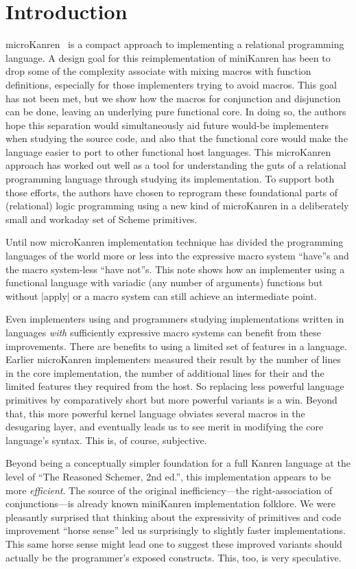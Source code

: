 \documentclass[sigplan,screen,draft,anonymous,review,natbib=false]{acmart}
\begin{document}
\section{Introduction}

microKanren~\cite{hemann2013muKanren} is a compact approach to
implementing a relational programming language. A design goal
for this reimplementation of miniKanren has been to drop some of the
complexity associate with mixing macros with function definitions,
especially for those implementers trying to avoid macros.  This goal
has not been met, but we show how the macros for conjunction and
disjunction can be done, leaving an underlying
pure functional core. In doing so, the authors hope this separation
would simultaneously aid future would-be implementers when studying
the source code, and also that the functional core would make the
language easier to port to other functional host languages. This
microKanren approach has worked out well as a tool for understanding
the guts of a relational programming language through studying its
implementation. To support both those efforts, the authors have chosen to
reprogram these foundational parts of (relational) logic programming
using a new kind of microKanren in a deliberately small and workaday set
of Scheme primitives.

Until now microKanren implementation technique has divided the
programming languages of the world more or less into the expressive
macro system \enquote{have}s and the macro system-less \enquote{have
  not}s. This note shows how an implementer using a functional
language with variadic (any number of arguments) functions but without
\rackinline|apply| or a macro system can still achieve an intermediate
point.

Even implementers using and programmers studying implementations
written in languages \emph{with} sufficiently expressive macro systems
can benefit from these improvements. There are benefits to using a
limited set of features in a language. Earlier microKanren implementers
measured their result by the number of lines in the core
implementation, the number of additional lines for their and the
limited features they required from the host. So replacing less
powerful language primitives by comparatively short but more powerful
variants is a win. Beyond that, this more powerful kernel language
obviates several macros in the desugaring layer, and eventually
leads us to see merit in modifying the core
language's syntax. This is, of course, subjective.

Beyond being a conceptually simpler foundation for a full Kanren
language at the level of ``The Reasoned Schemer, 2nd ed.'', this
implementation appears to be more \emph{efficient}. The
source of the original inefficiency---the right-association of
conjunctions---is already known miniKanren implementation folklore. We
were pleasantly surprised that thinking about the expressivity of
primitives and code improvement \enquote{horse sense} led us surprisingly
to slightly faster implementations. This same horse sense might lead one
to suggest these improved variants should actually be the programmer's
exposed constructs. This, too, is very speculative.
\end{document}

